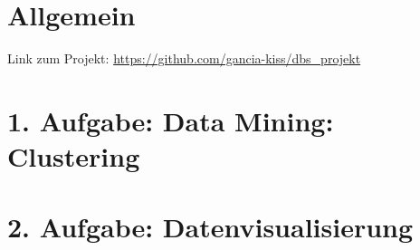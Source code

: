 \usepackage{graphicx}
\usepackage{listings} %

\newcommand{\dozent}{Prof.  Dr.  Agnès Voisard, Nicolas Lehmann}					%
\newcommand{\tutor}{Hoffman Christian}						%
\newcommand{\tutoriumNo}{ 3, Gruppe 22}				%
\newcommand{\projectNo}{3. Iteration}									%
\newcommand{\veranstaltung}{Datenbank Systeme}	%
\newcommand{\semester}{SoeSe 2017}						%
\newcommand{\studenten}{Ingrid Tchilibou, Emil Milanov, Boyan Hristov}			%






\section*{Allgemein}
Link zum Projekt: \url{https://github.com/gancia-kiss/dbs_projekt}


\section*{1. Aufgabe: Data Mining: Clustering}

\section*{2. Aufgabe: Datenvisualisierung}


